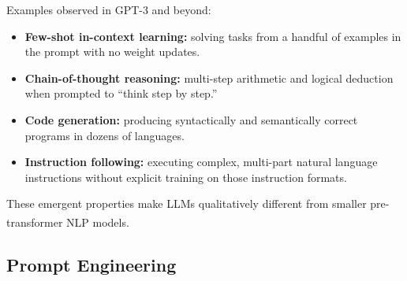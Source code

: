 \begin{tcbitemize}[ skin=sectionraster ]
    Examples observed in GPT-3 and beyond:
    \begin{itemize}
        \item \textbf{Few-shot in-context learning:} solving tasks from a handful of
              examples in the prompt with no weight updates.
        \item \textbf{Chain-of-thought reasoning:} multi-step arithmetic and logical
              deduction when prompted to ``think step by step.''
        \item \textbf{Code generation:} producing syntactically and semantically correct
              programs in dozens of languages.
        \item \textbf{Instruction following:} executing complex, multi-part natural
              language instructions without explicit training on those instruction formats.
    \end{itemize}
    These emergent properties make LLMs qualitatively different from smaller
    pre-transformer NLP
    models.\textsuperscript{\cite[][p.~114]{farrisHowLargeLanguage2025}}

\end{tcbitemize}

\subsection{Prompt Engineering}

